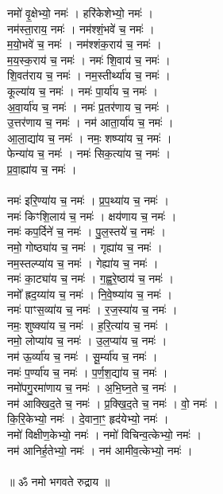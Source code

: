 नमो॑ वृ॒क्षेभ्यो॒ नमः॑ । हरि॑केशेभ्यो॒ नमः॑ ।\\
नम॑स्ता॒राय॒ नमः॑ । नम॑श्शं॒भवे॑ च॒ नमः॑ ।\\
म॒यो॒भवे॑ च॒ नमः॑ । नम॑श्शंक॒राय॑ च॒ नमः॑ ।\\
म॒य॒स्क॒राय॑ च॒ नमः॑ । नमः॑ शि॒वाय॑  च॒ नमः॑ ।\\
शि॒वत॑राय च॒ नमः॑ । नम॒स्तीर्थ्या॑य च॒ नमः॑ ।\\
कूल्या॑य च॒ नमः॑ । नमः॑ पा॒र्या॑य च॒ नमः॑ ।\\
अ॒वा॒र्या॑य च॒ नमः॑ । नमः॑ प्र॒तर॑णाय च॒ नमः॑ ।\\
उ॒त्तर॑णाय च॒ नमः॑ । नम॑ आता॒र्या॑य च॒ नमः॑ ।\\
आ॒ला॒द्या॑य च॒ नमः॑ । नमः॒ शष्प्या॑य च॒ नमः॑ ।\\
फेन्या॑य च॒ नमः॑ । नमः॑ सिक॒त्या॑य च॒ नमः॑ ।\\
प्र॒वा॒ह्या॑य च॒ नमः॑ ।\\
\\
नमः॑ इरि॒ण्या॑य च॒ नमः॑ । प्र॒प॒थ्या॑य च॒ नमः॑ ।\\
नमः॑ किꣳशि॒लाय॑ च॒ नमः॑ । क्षय॑णाय च॒ नमः॑ ।\\
नमः॑ कप॒र्दिने॑ च॒ नमः॑ । पु॒ल॒स्तये॑ च॒ नमः॑ ।\\
नमो॒ गोष्ठ्या॑य च॒ नमः॑ । गृह्या॑य च॒ नमः॑ ।\\
नम॒स्तल्प्या॑य च॒ नमः॑ । गेह्या॑य च॒ नमः॑ ।\\
नमः॑ का॒ट्या॑य च॒ नमः॑ । ग॒ह्व॒रे॒ष्ठाय॑ च॒ नमः॑ ।\\
नमो᳚ ह्रद॒य्या॑य च॒ नमः॑ । नि॒वे॒ष्प्या॑य च॒ नमः॑ ।\\
नमः॑ पाꣳस॒व्या॑य च॒ नमः॑ । र॒ज॒स्या॑य च॒ नमः॑ ।\\
नमः॒ शुष्क्या॑य च॒ नमः॑ । ह॒रि॒त्या॑य च॒ नमः॑ ।\\
नमो॒ लोप्या॑य च॒ नमः॑ । उ॒ल॒प्या॑य च॒ नमः॑ ।\\
नम॑ ऊ॒र्व्या॑य च॒ नमः॑ । सू॒र्म्या॑य च॒ नमः॑ ।\\
नमः॑ प॒र्ण्या॑य च॒ नमः॑ । प॒र्ण॒श॒द्या॑य च॒ नमः॑ ।\\
नमो॑पगु॒रमा॑णाय च॒ नमः॑ । अ॒भि॒घ्न॒ते च॒ नमः॑ ।\\
नम॑ आक्खिद॒ते च॒ नमः॑ । प्र॒क्खि॒द॒ते च॒ नमः॑ । वो॒ नमः॑ ।\\
कि॒रि॒केभ्यो॒ नमः॑ । दे॒वाना॒ꣳ॒ हृद॑येभ्यो॒ नमः॑ ।\\
नमो॑ विक्षीण॒केभ्यो॒ नमः॑ । नमो॑ विचिन्व॒त्केभ्यो॒ नमः॑ ।\\
नम॑ आनिर्ह॒तेभ्यो॒ नमः॑ । नम॑ आमीव॒त्केभ्यो॒ नमः॑ ।\\
\\
॥ ॐ नमो भगवते रुद्राय ॥\\
